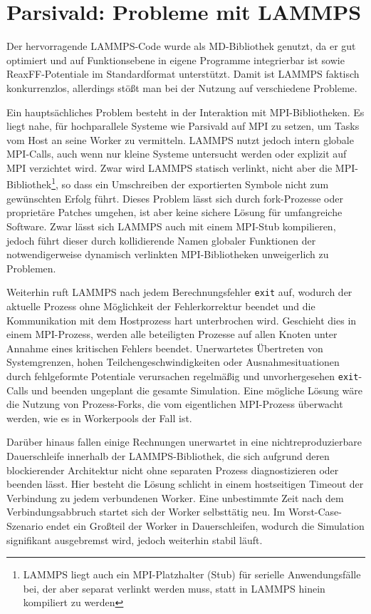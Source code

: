 \chapter{Parsivald: Probleme mit LAMMPS}
\label{lammpssucks}

Der hervorragende LAMMPS-Code wurde als MD-Bibliothek genutzt, da er gut optimiert und auf Funktionsebene in eigene Programme integrierbar ist sowie ReaxFF-Potentiale im Standardformat unterstützt.
Damit ist LAMMPS faktisch konkurrenzlos, allerdings stößt man bei der Nutzung auf verschiedene Probleme.

Ein hauptsächliches Problem besteht in der Interaktion mit MPI-Bibliotheken.
Es liegt nahe, für hochparallele Systeme wie Parsivald auf MPI zu setzen, um Tasks vom Host an seine Worker zu vermitteln.
LAMMPS nutzt jedoch intern globale MPI-Calls, auch wenn nur kleine Systeme untersucht werden oder explizit auf MPI verzichtet wird.
Zwar wird LAMMPS statisch verlinkt, nicht aber die MPI-Bibliothek\footnote{LAMMPS liegt auch ein MPI-Platzhalter (Stub) für serielle Anwendungsfälle bei, der aber separat verlinkt werden muss, statt in LAMMPS hinein kompiliert zu werden}, so dass ein Umschreiben der exportierten Symbole nicht zum gewünschten Erfolg führt.
Dieses Problem lässt sich durch fork-Prozesse oder proprietäre Patches umgehen, ist aber keine sichere Lösung für umfangreiche Software.
Zwar lässt sich LAMMPS auch mit einem MPI-Stub kompilieren, jedoch führt dieser durch kollidierende Namen globaler Funktionen der notwendigerweise dynamisch verlinkten MPI-Bibliotheken unweigerlich zu Problemen.

Weiterhin ruft LAMMPS nach jedem Berechnungsfehler \texttt{exit} auf, wodurch der aktuelle Prozess ohne Möglichkeit der Fehlerkorrektur beendet und die Kommunikation mit dem Hostprozess hart unterbrochen wird.
Geschieht dies in einem MPI-Prozess, werden alle beteiligten Prozesse auf allen Knoten unter Annahme eines kritischen Fehlers beendet.
Unerwartetes Übertreten von Systemgrenzen, hohen Teilchengeschwindigkeiten oder Ausnahmesituationen durch fehlgeformte Potentiale verursachen regelmäßig und unvorhergesehen \texttt{exit}-Calls und beenden ungeplant die gesamte Simulation.
Eine mögliche Lösung wäre die Nutzung von Prozess-Forks, die vom eigentlichen MPI-Prozess überwacht werden, wie es in Workerpools der Fall ist.

Darüber hinaus fallen einige Rechnungen unerwartet in eine nichtreproduzierbare Dauerschleife innerhalb der LAMMPS-Bibliothek, die sich aufgrund deren blockierender Architektur nicht ohne separaten Prozess diagnostizieren oder beenden lässt.
Hier besteht die Lösung schlicht in einem hostseitigen Timeout der Verbindung zu jedem verbundenen Worker.
Eine unbestimmte Zeit nach dem Verbindungsabbruch startet sich der Worker selbsttätig neu.
Im Worst-Case-Szenario endet ein Großteil der Worker in Dauerschleifen, wodurch die Simulation signifikant ausgebremst wird, jedoch weiterhin stabil läuft.



